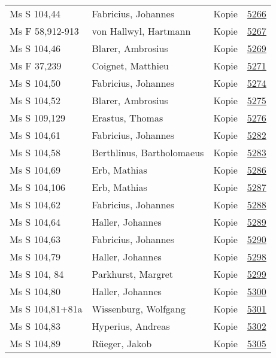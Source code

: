 \documentclass[10pt,a4paper,landscape]{report}
\begin{document}
\begin{longtable}{p{16cm}p{4cm}lr}
Ms S 104,44	&	Fabricius, Johannes	&	Kopie	&	\href{http://130.60.24.72/assignment/5266}{5266}\\
Ms F 58,912-913	&	von Hallwyl, Hartmann	&	Kopie	&	\href{http://130.60.24.72/assignment/5267}{5267}\\
Ms S 104,46	&	Blarer, Ambrosius	&	Kopie	&	\href{http://130.60.24.72/assignment/5269}{5269}\\
Ms F 37,239	&	Coignet, Matthieu	&	Kopie	&	\href{http://130.60.24.72/assignment/5271}{5271}\\
Ms S 104,50	&	Fabricius, Johannes	&	Kopie	&	\href{http://130.60.24.72/assignment/5274}{5274}\\
Ms S 104,52	&	Blarer, Ambrosius	&	Kopie	&	\href{http://130.60.24.72/assignment/5275}{5275}\\
Ms S 109,129	&	Erastus, Thomas	&	Kopie	&	\href{http://130.60.24.72/assignment/5276}{5276}\\
Ms S 104,61	&	Fabricius, Johannes	&	Kopie	&	\href{http://130.60.24.72/assignment/5282}{5282}\\
Ms S 104,58	&	Berthlinus, Bartholomaeus	&	Kopie	&	\href{http://130.60.24.72/assignment/5283}{5283}\\
Ms S 104,69	&	Erb, Mathias	&	Kopie	&	\href{http://130.60.24.72/assignment/5286}{5286}\\
Ms S 104,106	&	Erb, Mathias	&	Kopie	&	\href{http://130.60.24.72/assignment/5287}{5287}\\
Ms S 104,62	&	Fabricius, Johannes	&	Kopie	&	\href{http://130.60.24.72/assignment/5288}{5288}\\
Ms S 104,64	&	Haller, Johannes	&	Kopie	&	\href{http://130.60.24.72/assignment/5289}{5289}\\
Ms S 104,63	&	Fabricius, Johannes	&	Kopie	&	\href{http://130.60.24.72/assignment/5290}{5290}\\
Ms S 104,79	&	Haller, Johannes	&	Kopie	&	\href{http://130.60.24.72/assignment/5298}{5298}\\
Ms S 104, 84	&	Parkhurst, Margret	&	Kopie	&	\href{http://130.60.24.72/assignment/5299}{5299}\\
Ms S 104,80	&	Haller, Johannes	&	Kopie	&	\href{http://130.60.24.72/assignment/5300}{5300}\\
Ms S 104,81+81a	&	Wissenburg, Wolfgang	&	Kopie	&	\href{http://130.60.24.72/assignment/5301}{5301}\\
Ms S 104,83	&	Hyperius, Andreas	&	Kopie	&	\href{http://130.60.24.72/assignment/5302}{5302}\\
Ms S 104,89	&	Rüeger, Jakob	&	Kopie	&	\href{http://130.60.24.72/assignment/5305}{5305}\\

\end{longtable}
\end{document}
